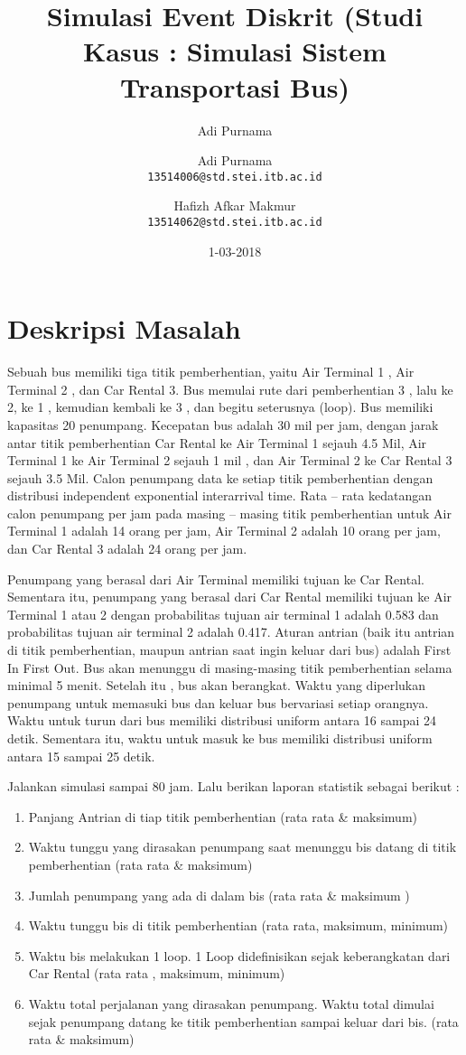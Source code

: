 \documentclass{article}
\title{Simulasi Event Diskrit (Studi Kasus : Simulasi Sistem Transportasi Bus)}
\date{1-03-2018}
\author{Adi Purnama}
\author{
  Adi Purnama\\
  \texttt{13514006@std.stei.itb.ac.id}
  \and
  Hafizh Afkar Makmur\\
  \texttt{13514062@std.stei.itb.ac.id}
}
\begin{document}
	\maketitle

	\section{Deskripsi Masalah}	
Sebuah bus memiliki tiga titik pemberhentian, yaitu Air Terminal 1 , Air Terminal 2 , dan Car Rental 3.
Bus memulai rute dari pemberhentian 3 , lalu ke 2, ke 1 , kemudian kembali ke 3 , dan begitu seterusnya (loop). 
Bus memiliki kapasitas 20 penumpang. Kecepatan bus adalah 30 mil per jam, dengan jarak antar titik pemberhentian Car Rental ke Air Terminal 1 sejauh 4.5 Mil, Air Terminal 1 ke Air Terminal 2 sejauh 1 mil , dan Air Terminal 2 ke Car Rental 3 sejauh 3.5 Mil.
Calon penumpang data ke setiap titik pemberhentian dengan distribusi independent exponential interarrival time. Rata – rata kedatangan calon penumpang per jam pada masing – masing titik pemberhentian untuk Air Terminal 1 adalah 14 orang per jam, Air Terminal 2 adalah 10 orang per jam, dan Car Rental 3 adalah 24 orang per jam.

Penumpang yang berasal dari Air Terminal memiliki tujuan ke Car Rental. Sementara itu, penumpang yang berasal dari Car Rental memiliki tujuan ke Air Terminal 1 atau 2 dengan probabilitas tujuan air terminal 1	adalah 0.583 dan probabilitas tujuan air terminal 2 adalah 0.417.
Aturan antrian (baik itu antrian di titik pemberhentian, maupun antrian saat ingin keluar dari bus) adalah First In First Out. Bus akan menunggu di masing-masing titik pemberhentian selama minimal 5 menit. Setelah itu , bus akan berangkat.
Waktu yang diperlukan penumpang untuk memasuki bus dan keluar bus bervariasi setiap orangnya. 
Waktu untuk turun dari bus memiliki distribusi uniform antara 16 sampai 24 detik. Sementara itu, waktu untuk masuk ke bus memiliki distribusi uniform antara 15 sampai 25 detik.

Jalankan simulasi sampai 80 jam. Lalu berikan laporan statistik sebagai berikut :
	\begin{enumerate}
	\item Panjang Antrian di tiap titik pemberhentian (rata rata \& maksimum)
	\item Waktu tunggu yang dirasakan penumpang saat menunggu bis datang di titik pemberhentian (rata rata \& maksimum)
	\item Jumlah penumpang yang ada di dalam bis (rata rata \& maksimum )
	\item Waktu tunggu bis di titik pemberhentian (rata rata, maksimum, minimum)
	\item Waktu bis melakukan 1 loop. 1 Loop didefinisikan sejak keberangkatan dari Car Rental (rata rata , maksimum, minimum)
	\item Waktu total perjalanan yang dirasakan penumpang. Waktu total dimulai sejak penumpang datang ke titik pemberhentian sampai keluar dari bis. (rata rata \& maksimum)
	\end{enumerate}
\end{document}
